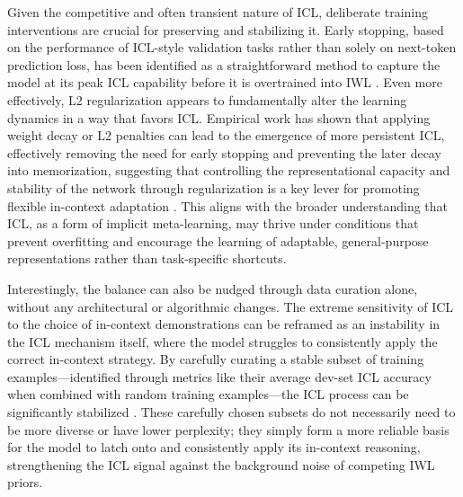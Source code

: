 \documentclass[11pt]{article}
\begin{document}
Given the competitive and often transient nature of ICL, deliberate training interventions are crucial for preserving and stabilizing it. Early stopping, based on the performance of ICL-style validation tasks rather than solely on next-token prediction loss, has been identified as a straightforward method to capture the model at its peak ICL capability before it is overtrained into IWL \cite{ref73}. Even more effectively, L2 regularization appears to fundamentally alter the learning dynamics in a way that favors ICL. Empirical work has shown that applying weight decay or L2 penalties can lead to the emergence of more persistent ICL, effectively removing the need for early stopping and preventing the later decay into memorization, suggesting that controlling the representational capacity and stability of the network through regularization is a key lever for promoting flexible in-context adaptation \cite{ref73}. This aligns with the broader understanding that ICL, as a form of implicit meta-learning, may thrive under conditions that prevent overfitting and encourage the learning of adaptable, general-purpose representations rather than task-specific shortcuts.

Interestingly, the balance can also be nudged through data curation alone, without any architectural or algorithmic changes. The extreme sensitivity of ICL to the choice of in-context demonstrations can be reframed as an instability in the ICL mechanism itself, where the model struggles to consistently apply the correct in-context strategy. By carefully curating a stable subset of training examples---identified through metrics like their average dev-set ICL accuracy when combined with random training examples---the ICL process can be significantly stabilized \cite{ref34}. These carefully chosen subsets do not necessarily need to be more diverse or have lower perplexity; they simply form a more reliable basis for the model to latch onto and consistently apply its in-context reasoning, strengthening the ICL signal against the background noise of competing IWL priors.
\end{document}
